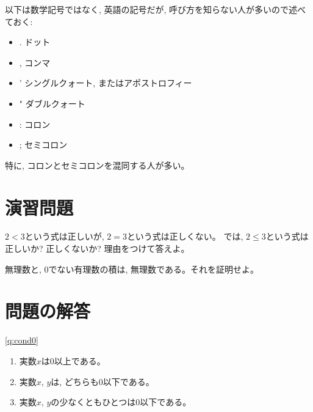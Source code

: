 以下は数学記号ではなく, 英語の記号だが, 呼び方を知らない人が多いので述べておく:
\begin{itemize}
\item . ドット
\item , コンマ
\item ' シングルクォート, またはアポストロフィー
\item " ダブルクォート
\item : コロン
\item ; セミコロン
\end{itemize}
特に, コロンとセミコロンを混同する人が多い。


\hv

\section*{演習問題}
\begin{exq}\label{q:2leq3} $2<3$という式は正しいが, $2=3$という式は正しくない。
では, $2\leq3$という式は正しいか? 正しくないか? 理由をつけて答えよ。\end{exq}

\begin{exq}\label{q:iirational_rational} 無理数と, 0でない有理数の積は, 無理数である。それを証明せよ。\end{exq}
\hv




\section*{問題の解答}

\ref{q:cond0}
\begin{enumerate}
\item 実数$x$は0以上である。
\item 実数$x,\,y$は, どちらも0以下である。
\item 実数$x,\,y$の少なくともひとつは0以下である。
\end{enumerate}
\hv

